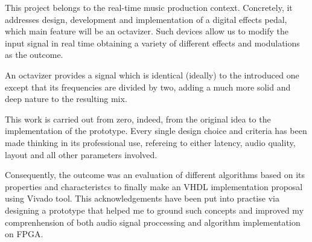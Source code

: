This project belongs to the real-time music production context. Concretely, it addresses design, development and implementation of a digital effects pedal, which main feature will be an octavizer. Such devices allow us to modify the input signal in real time obtaining a variety of different effects and modulations as the outcome.

An octavizer provides a signal which is identical (ideally) to the introduced one except that its frequencies are divided by two, adding a much more solid and deep nature to the resulting mix.

This work is carried out from zero, indeed, from the original idea to the implementation of the prototype. Every single design choice and criteria has been made thinking in its professional use, refereing to either latency, audio quality, layout and all other parameters involved.

Consequently, the outcome was an evaluation of different algorithms based on its properties and characteristcs to finally make an VHDL implementation proposal using Vivado tool. This acknowledgements have been put into practise via designing a prototype that helped me to ground such concepts and improved my comprenhension of both audio signal proccessing and algorithm implementation on FPGA.
